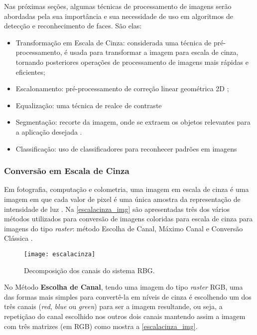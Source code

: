 Nas próximas seções, algumas técnicas de processamento de imagens serão abordadas pela sua importância e sua necessidade de uso em algoritmos de detecção e reconhecimento de faces. São elas:

\begin{itemize}
	\item Transformação em Escala de Cinza: considerada uma técnica de pré-processamento, é usada para transformar a imagem para  escala de cinza, tornando posteriores operações de processamento de imagens mais rápidas e eficientes;
	\item Escalonamento: pré-processamento de correção linear geométrica 2D \cite{lapix_escala};
	\item Equalização: uma técnica de realce de contraste \cite{gonzalez_woods}
	\item Segmentação: recorte da imagem, onde se extraem os objetos relevantes para a aplicação desejada \cite{inpe_proc_img}.
	\item Classificação: uso de classificadores para reconhecer padrões em imagens \cite{drmathew_java_programming}
\end{itemize}

\subsubsection{Conversão em Escala de Cinza}\label{subsubsec:filtros}

Em fotografia, computação e colometria, uma imagem em escala de cinza é uma imagem em que cada valor de pixel é uma única amostra da representação de intensidade de luz \cite{stephen_greyscale}. Na \autoref{escalacinza_img} são apresentadas três dos vários métodos utilizados para conversão de imagens coloridas para escala de cinza para imagens do tipo \textit{raster}: método Escolha de Canal, Máximo Canal e Conversão Clássica \cite{ricardo_pdi}.

\begin{figure}[h]
	\centering
	\texttt{[image: escalacinza]}
	\caption{Decomposição dos canais do sistema RBG. }
	\label{escalacinza_img}
\end{figure}

No Método \textbf{Escolha de Canal}, tendo uma imagem do tipo \textit{raster} RGB, uma das formas mais simples para convertê-la em níveis de cinza é escolhendo um dos três canais (\textit{red}, \textit{blue} ou \textit{green}) para ser a imagem resultande, ou seja, a repetiçãao do canal escolhido nos outros dois canais mantendo assim a imagem com três matrizes (em RGB) como mostra a \autoref{escalacinza_img}.	


